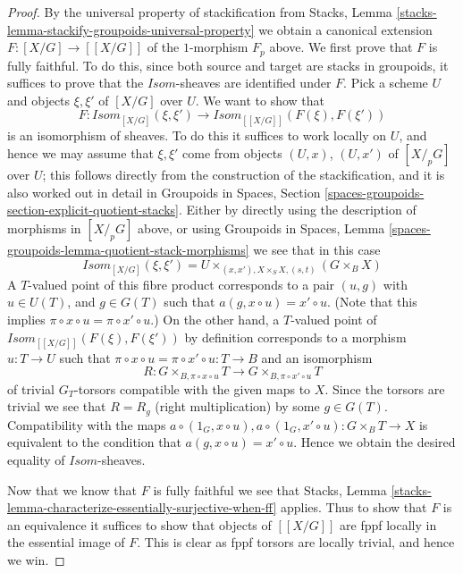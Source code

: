 \begin{proof}
\medskip\noindent
By the universal property of stackification from
Stacks, Lemma \ref{stacks-lemma-stackify-groupoids-universal-property}
we obtain a canonical extension $F : [X/G] \to [[X/G]]$ of the $1$-morphism
$F_p$ above. We first prove that $F$ is fully faithful.
To do this, since both source and target are stacks in groupoids,
it suffices to prove that the $\mathit{Isom}$-sheaves are identified
under $F$. Pick a scheme $U$ and objects $\xi, \xi'$ of
$[X/G]$ over $U$. We want to show that
$$
F :
\mathit{Isom}_{[X/G]}(\xi, \xi')
\longrightarrow
\mathit{Isom}_{[[X/G]]}(F(\xi), F(\xi'))
$$
is an isomorphism of sheaves. To do this it suffices to work locally
on $U$, and hence we may assume that $\xi, \xi'$ come from objects
$(U, x)$, $(U, x')$ of $[X/_{\!p}G]$ over $U$; this follows directly
from the construction of the stackification, and it is also worked
out in detail in
Groupoids in Spaces,
Section \ref{spaces-groupoids-section-explicit-quotient-stacks}.
Either by directly using the description of morphisms in
$[X/_{\!p}G]$ above, or using
Groupoids in Spaces,
Lemma \ref{spaces-groupoids-lemma-quotient-stack-morphisms}
we see that in this case
$$
\mathit{Isom}_{[X/G]}(\xi, \xi') =
U \times_{(x, x'), X \times_S X, (s, t)} (G \times_B X)
$$
A $T$-valued point of this fibre product corresponds to a pair
$(u, g)$ with $u \in U(T)$, and $g \in G(T)$ such that
$a(g, x \circ u) = x' \circ u$. (Note that this implies
$\pi \circ x \circ u = \pi \circ x' \circ u$.)
On the other hand, a $T$-valued
point of $\mathit{Isom}_{[[X/G]]}(F(\xi), F(\xi'))$ by definition
corresponds to a morphism $u : T \to U$ such that
$\pi \circ x \circ u = \pi \circ x' \circ u : T \to B$ and an isomorphism
$$
R :
G \times_{B, \pi \circ x \circ u} T
\longrightarrow
G \times_{B, \pi \circ x' \circ u} T
$$
of trivial $G_T$-torsors compatible with the given maps to $X$.
Since the torsors are trivial we see that $R = R_g$ (right multiplication)
by some $g \in G(T)$. Compatibility with the maps
$a \circ (1_G, x \circ u), a \circ (1_G, x' \circ u) : G \times_B T \to X$
is equivalent to the condition that $a(g, x \circ u) = x' \circ u$.
Hence we obtain the desired equality of $\mathit{Isom}$-sheaves.

\medskip\noindent
Now that we know that $F$ is fully faithful we see that
Stacks, Lemma \ref{stacks-lemma-characterize-essentially-surjective-when-ff}
applies. Thus to show that $F$ is an equivalence it suffices
to show that objects of $[[X/G]]$ are fppf locally in the essential image
of $F$. This is clear as fppf torsors are locally trivial, and hence
we win.
\end{proof}

